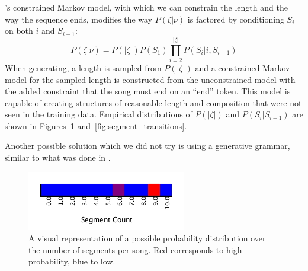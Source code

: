 \documentclass[letterpaper]{article}
\begin{document}
\citeauthor{pachet2001finite}'s constrained Markov model, with which we can constrain the length and the way the sequence ends, modifies the way $P(\zeta|\nu)$ is factored by conditioning $S_i$ on both $i$ and $S_{i-1}$:
\[ P(\zeta|\nu) = P(|\zeta|) P(S_1) \prod_{i=2}^{|\zeta|} P(S_i|i,S_{i-1}) \]
When generating, a length is sampled from $P(|\zeta|)$ and a constrained Markov model for the sampled length is constructed from the unconstrained model with the added constraint that the song must end on an ``end'' token. This model is capable of creating structures of reasonable length and composition that were not seen in the training data. Empirical distributions of $P(|\zeta|)$ and $P(S_i|S_{i-1})$ are shown in Figures~\ref{fig:segment_count_per_song} and~\ref{fig:segment_transitions}.

Another possible solution which we did not try is using a generative grammar, similar to what was done in \cite{steedman1984generative}.

\begin{figure}
	\centering
	\includegraphics[width=\linewidth]{segment_count_per_song}
	\caption{\label{fig:segment_count_per_song} A visual representation of a possible probability distribution over the number of segments per song. Red corresponds to high probability, blue to low.}
\end{figure}
\end{document}

